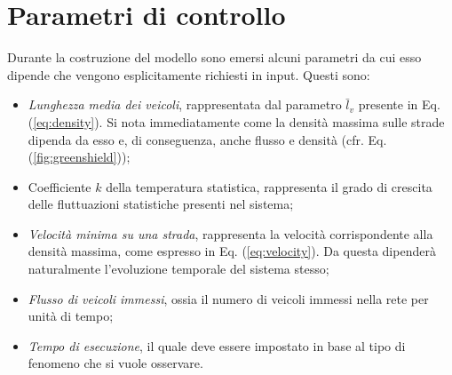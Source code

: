 \documentclass[../main.tex]{subfiles}
\begin{document}
\section{Parametri di controllo}
Durante la costruzione del modello sono emersi alcuni parametri da cui esso dipende che vengono esplicitamente richiesti in input.
Questi sono:
\begin{itemize}
    \item \emph{Lunghezza media dei veicoli}, rappresentata dal parametro $\bar{l}_v$ presente in Eq. (\ref{eq:density}).
        Si nota immediatamente come la densit\`a massima sulle strade dipenda da esso e, di conseguenza, anche flusso e densit\`a (cfr. Eq. (\ref{fig:greenshield}));
    \item Coefficiente $k$ della temperatura statistica, rappresenta il grado di crescita delle fluttuazioni statistiche presenti nel sistema;
    \item \emph{Velocit\`a minima su una strada}, rappresenta la velocit\`a corrispondente alla densit\`a massima, come espresso in Eq. (\ref{eq:velocity}).
        Da questa dipender\`a naturalmente l'evoluzione temporale del sistema stesso;
    \item \emph{Flusso di veicoli immessi}, ossia il numero di veicoli immessi nella rete per unit\`a di tempo;
    \item \emph{Tempo di esecuzione}, il quale deve essere impostato in base al tipo di fenomeno che si vuole osservare.
\end{itemize}
\end{document}

